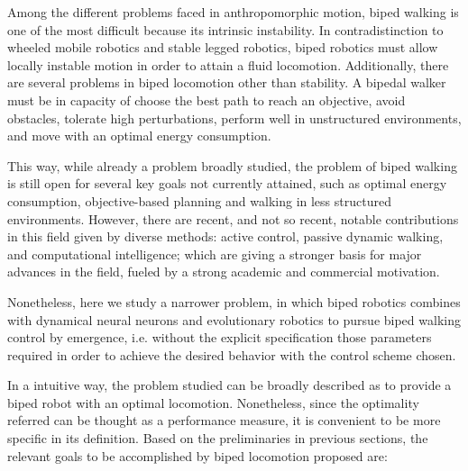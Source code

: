 Among the different problems faced in anthropomorphic motion, biped
walking is one of the most difficult because its intrinsic
instability. In contradistinction to wheeled mobile robotics and
stable legged robotics, biped robotics must allow locally instable
motion in order to attain a fluid locomotion. Additionally, there are
several problems in biped locomotion other than stability. A bipedal
walker must be in capacity of choose the best path to reach an
objective, avoid obstacles, tolerate high perturbations, perform well
in unstructured environments, and move with an optimal energy
consumption.


This way, while already a problem broadly studied, the problem of
biped walking is still open for several key goals not currently
attained, such as optimal energy consumption, objective-based planning
and walking in less structured environments. However, there are
recent, and not so recent, notable contributions in this field given
by diverse methods: active control, passive dynamic walking, and
computational intelligence; which are giving a stronger basis for
major advances in the field, fueled by a strong academic and
commercial motivation.

Nonetheless, here we study a narrower problem, in which biped robotics
combines with dynamical neural neurons and evolutionary robotics to
pursue biped walking control by emergence, i.e. without the explicit
specification those parameters required in order to achieve the
desired behavior with the control scheme chosen.

In a intuitive way, the problem studied can be broadly described as to
provide a biped robot with an optimal locomotion. Nonetheless, since
the optimality referred can be thought as a performance measure, it is
convenient to be more specific in its definition. Based on the
preliminaries in previous sections, the relevant goals to be
accomplished by biped locomotion proposed are:

